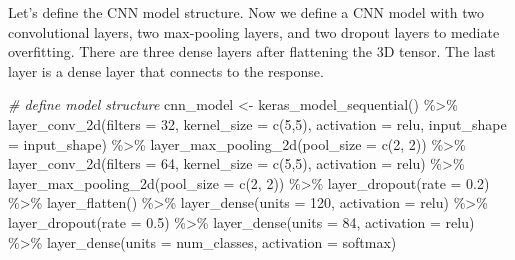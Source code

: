 \documentclass[
  12pt,
]{krantz}
\makeatletter
\newenvironment{Shaded}{\begin{snugshade}}{\end{snugshade}}
\newcommand{\AttributeTok}[1]{\textcolor[rgb]{0.61,0.61,0.61}{#1}}
\newcommand{\CommentTok}[1]{\textcolor[rgb]{0.37,0.37,0.37}{\textit{#1}}}
\newcommand{\DecValTok}[1]{\textcolor[rgb]{0.06,0.06,0.06}{#1}}
\newcommand{\FloatTok}[1]{\textcolor[rgb]{0.06,0.06,0.06}{#1}}
\newcommand{\FunctionTok}[1]{\textcolor[rgb]{0,0,0}{#1}}
\newcommand{\NormalTok}[1]{#1}
\newcommand{\OtherTok}[1]{\textcolor[rgb]{0.37,0.37,0.37}{#1}}
\newcommand{\SpecialCharTok}[1]{\textcolor[rgb]{0,0,0}{#1}}
\newcommand{\StringTok}[1]{\textcolor[rgb]{0.5,0.5,0.5}{#1}}
\newenvironment{kframe}{%
\medskip{}
\setlength{\fboxsep}{.8em}
 \def\at@end@of@kframe{}%
 \ifinner\ifhmode%
  \def\at@end@of@kframe{\end{minipage}}%
  \begin{minipage}{\columnwidth}%
 \fi\fi%
 \def\FrameCommand##1{\hskip\@totalleftmargin \hskip-\fboxsep
 \colorbox{shadecolor}{##1}\hskip-\fboxsep
     \hskip-\linewidth \hskip-\@totalleftmargin \hskip\columnwidth}%
 \MakeFramed {\advance\hsize-\width
   \@totalleftmargin\z@ \linewidth\hsize
   \@setminipage}}%
 {\par\unskip\endMakeFramed%
 \at@end@of@kframe}
\renewenvironment{Shaded}{\begin{kframe}}{\end{kframe}}
\makeatother
\begin{document}
Let's define the CNN model structure. Now we define a CNN model with two convolutional layers, two max-pooling layers, and two dropout layers to mediate overfitting. There are three dense layers after flattening the 3D tensor. The last layer is a dense layer that connects to the response.

\begin{Shaded}
\begin{Highlighting}[]
\CommentTok{\# define model structure}
\NormalTok{cnn\_model }\OtherTok{\textless{}{-}} \FunctionTok{keras\_model\_sequential}\NormalTok{() }\SpecialCharTok{\%\textgreater{}\%}
  \FunctionTok{layer\_conv\_2d}\NormalTok{(}\AttributeTok{filters =} \DecValTok{32}\NormalTok{,}
                \AttributeTok{kernel\_size =} \FunctionTok{c}\NormalTok{(}\DecValTok{5}\NormalTok{,}\DecValTok{5}\NormalTok{),}
                \AttributeTok{activation =} \StringTok{\textquotesingle{}relu\textquotesingle{}}\NormalTok{,}
                \AttributeTok{input\_shape =}\NormalTok{ input\_shape) }\SpecialCharTok{\%\textgreater{}\%}
  \FunctionTok{layer\_max\_pooling\_2d}\NormalTok{(}\AttributeTok{pool\_size =} \FunctionTok{c}\NormalTok{(}\DecValTok{2}\NormalTok{, }\DecValTok{2}\NormalTok{)) }\SpecialCharTok{\%\textgreater{}\%}
  \FunctionTok{layer\_conv\_2d}\NormalTok{(}\AttributeTok{filters =} \DecValTok{64}\NormalTok{,}
                \AttributeTok{kernel\_size =} \FunctionTok{c}\NormalTok{(}\DecValTok{5}\NormalTok{,}\DecValTok{5}\NormalTok{),}
                \AttributeTok{activation =} \StringTok{\textquotesingle{}relu\textquotesingle{}}\NormalTok{) }\SpecialCharTok{\%\textgreater{}\%}
  \FunctionTok{layer\_max\_pooling\_2d}\NormalTok{(}\AttributeTok{pool\_size =} \FunctionTok{c}\NormalTok{(}\DecValTok{2}\NormalTok{, }\DecValTok{2}\NormalTok{)) }\SpecialCharTok{\%\textgreater{}\%}
  \FunctionTok{layer\_dropout}\NormalTok{(}\AttributeTok{rate =} \FloatTok{0.2}\NormalTok{) }\SpecialCharTok{\%\textgreater{}\%}
  \FunctionTok{layer\_flatten}\NormalTok{() }\SpecialCharTok{\%\textgreater{}\%}
  \FunctionTok{layer\_dense}\NormalTok{(}\AttributeTok{units =} \DecValTok{120}\NormalTok{, }\AttributeTok{activation =} \StringTok{\textquotesingle{}relu\textquotesingle{}}\NormalTok{) }\SpecialCharTok{\%\textgreater{}\%}
  \FunctionTok{layer\_dropout}\NormalTok{(}\AttributeTok{rate =} \FloatTok{0.5}\NormalTok{) }\SpecialCharTok{\%\textgreater{}\%}
  \FunctionTok{layer\_dense}\NormalTok{(}\AttributeTok{units =} \DecValTok{84}\NormalTok{, }\AttributeTok{activation =} \StringTok{\textquotesingle{}relu\textquotesingle{}}\NormalTok{) }\SpecialCharTok{\%\textgreater{}\%}
  \FunctionTok{layer\_dense}\NormalTok{(}\AttributeTok{units =}\NormalTok{ num\_classes, }\AttributeTok{activation =} \StringTok{\textquotesingle{}softmax\textquotesingle{}}\NormalTok{)}
\end{Highlighting}
\end{Shaded}
\end{document}
